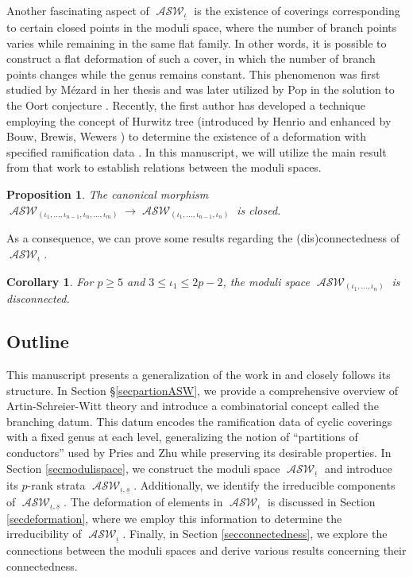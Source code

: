 \documentclass{compositio}
\newcommand{\mat}[1]{\todo[color=green]{MH: #1}}
\newtheorem{proposition}[theorem]{Proposition}
\newtheorem{corollary}[theorem]{Corollary}
\theoremstyle{remark}
\theoremstyle{remark}
\DeclareMathOperator{\ASW}{\mathcal{ASW}}
\begin{document}
Another fascinating aspect of $\ASW_{\underline{\iota}}$ is the existence of coverings corresponding to certain closed points in the moduli space, where the number of branch points varies while remaining in the same flat family. In other words, it is possible to construct a flat deformation of such a cover, in which the number of branch points changes while the genus remains constant. This phenomenon was first studied by M{\'e}zard in her thesis \cite{MEZAR1998} and was later utilized by Pop in the solution to the Oort conjecture \cite{MR3194816}. Recently, the first author has developed a technique employing the concept of Hurwitz tree (introduced by Henrio \cite{2000math.....11098H} and enhanced by Bouw, Brewis, Wewers \cite{MR2254623} \cite{MR2534115}) to determine the existence of a deformation with specified ramification data \cite{2020arXiv200203719D, 2020arXiv201013614D}. In this manuscript, we will utilize the main result from that work to establish relations between the moduli spaces.
\begin{proposition}
    The canonical morphism $\ASW_{(\iota_1, \ldots, \iota_{n-1}, \iota_n, \ldots, \iota_m)} \xrightarrow{} \ASW_{(\iota_1, \ldots, \iota_{n-1}, \iota_n)}$ is closed.
\end{proposition}
As a consequence, we can prove some results regarding the (dis)connectedness of $\ASW_{\underline{\iota}}$.
\begin{corollary}
For $p \geq 5$ and $3 \leq \iota_1 \leq 2p-2$, the moduli space $\ASW_{(\iota_1, \ldots, \iota_n)}$ is disconnected.
\end{corollary}
\subsection{Outline} This manuscript presents a generalization of the work in \cite{MR2985514} and closely follows its structure. In Section \S \ref{secpartionASW}, we provide a comprehensive overview of Artin-Schreier-Witt theory and introduce a combinatorial concept called the branching datum. This datum encodes the ramification data of cyclic coverings with a fixed genus at each level, generalizing the notion of ``partitions of conductors'' used by Pries and Zhu while preserving its desirable properties. In Section \ref{secmodulispace}, we construct the moduli space $\ASW_{\underline{\iota}}$ and introduce its $p$-rank strata $\ASW_{\underline{\iota},\underline{s}}$. Additionally, we identify the irreducible components of $\ASW_{\underline{\iota},\underline{s}}$. The deformation of elements in $\ASW_{\underline{\iota}}$ is discussed in Section \ref{secdeformation}, where we employ this information to determine the irreducibility of $\ASW_{\underline{\iota}}$. Finally, in Section \ref{secconnectedness}, we explore the connections between the moduli spaces and derive various results concerning their connectedness.
\end{document}
